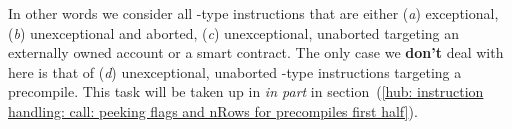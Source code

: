 \begin{center}
\end{center}
In other words we consider all -type instructions that are either
(\emph{a}) exceptional,
(\emph{b}) unexceptional and aborted,
(\emph{c}) unexceptional, unaborted targeting an externally owned account or a smart contract.
The only case we \textbf{don't} deal with here is that of
(\emph{d}) unexceptional, unaborted -type instructions targeting a precompile.
This task will be taken up in \emph{in part} in
section~(\ref{hub: instruction handling: call: peeking flags and nRows for precompiles first half}).
